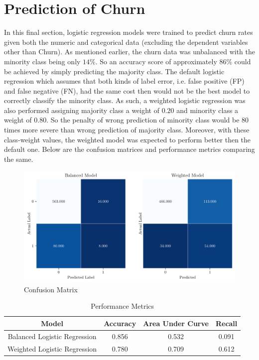 \documentclass{article}
\begin{document}
\section{Prediction of Churn}
In this final section, logistic regression models were trained to predict churn rates given both the numeric and categorical data (excluding the dependent variables other than Churn). As mentioned earlier, the churn data was unbalanced with the minority class being only $14\%$. So an accuracy score of approximately $86\%$ could be achieved by simply predicting the majority class. The default logistic regression which assumes that both kinds of label error, i.e. false positive (FP) and false negative (FN), had the same cost then would not be the best model to correctly classify the minority class. As such, a weighted logistic regression was also performed assigning majority class a weight of $0.20$ and minority class a weight of $0.80$. So the penalty of wrong prediction of minority class would be $80$ times more severe than wrong prediction of majority class. Moreover, with these class-weight values, the weighted model was expected to perform better then the default one. Below are the confusion matrices and performance metrics comparing the same.
\begin{figure}[H]
	\begin{center}
		\includegraphics[scale=0.50]{conf_mat.pdf}
	\end{center}
	\caption{Confusion Matrix}
\end{figure}
\begin{table}[ht]
	\begin{center}
	\begin{tabular}{|| c | c | c | c ||}
		\hline
		Model & Accuracy & Area Under Curve & Recall \\ [1ex]
		\hline\hline
		Balanced Logistic Regression & 0.856 & 0.532 & 0.091 \\ 
		\hline
		Weighted Logistic Regression & 0.780 & 0.709 & 0.612 \\ [1ex]
		\hline
	\end{tabular}
\vspace{0.1cm}
\caption{Performance Metrics}
\label{tab:caption}
\end{center}
\end{table}%
\end{document}
